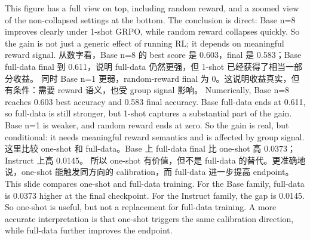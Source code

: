 {}\markdownRendererInterblockSeparator
{}This figure has a full view on top, including random reward, and a zoomed view of the non-collapsed settings at the bottom.\markdownRendererInterblockSeparator
{}The conclusion is direct: Base n=8 improves clearly under 1-shot GRPO, while random reward collapses quickly. So the gain is not just a generic effect of running RL; it depends on meaningful reward signal.\markdownRendererInterblockSeparator
{}\markdownRendererHorizontalRule{}\markdownRendererInterblockSeparator
{}\markdownRendererInterblockSeparator
{}\markdownRendererInterblockSeparator
{}从数字看，Base n=8 的 best score 是 0.603，final 是 0.583；Base full-data final 到 0.611，说明 full-data 仍然更强，但 1-shot 已经获得了相当一部分收益。\markdownRendererInterblockSeparator
{}同时 Base n=1 更弱，random-reward final 为 0。这说明收益真实，但有条件：需要 reward 语义，也受 group signal 影响。\markdownRendererInterblockSeparator
{}\markdownRendererInterblockSeparator
{}Numerically, Base n=8 reaches 0.603 best accuracy and 0.583 final accuracy. Base full-data ends at 0.611, so full-data is still stronger, but 1-shot captures a substantial part of the gain.\markdownRendererInterblockSeparator
{}Base n=1 is weaker, and random reward ends at zero. So the gain is real, but conditional: it needs meaningful reward semantics and is affected by group signal.\markdownRendererInterblockSeparator
{}\markdownRendererHorizontalRule{}\markdownRendererInterblockSeparator
{}\markdownRendererInterblockSeparator
{}\markdownRendererInterblockSeparator
{}这里比较 one-shot 和 full-data。Base 上 full-data final 比 one-shot 高 0.0373；Instruct 上高 0.0145。\markdownRendererInterblockSeparator
{}所以 one-shot 有价值，但不是 full-data 的替代。更准确地说，one-shot 能触发同方向的 calibration，而 full-data 进一步提高 endpoint。\markdownRendererInterblockSeparator
{}\markdownRendererInterblockSeparator
{}This slide compares one-shot and full-data training. For the Base family, full-data is 0.0373 higher at the final checkpoint. For the Instruct family, the gap is 0.0145.\markdownRendererInterblockSeparator
{}So one-shot is useful, but not a replacement for full-data training. A more accurate interpretation is that one-shot triggers the same calibration direction, while full-data further improves the endpoint.\markdownRendererInterblockSeparator
